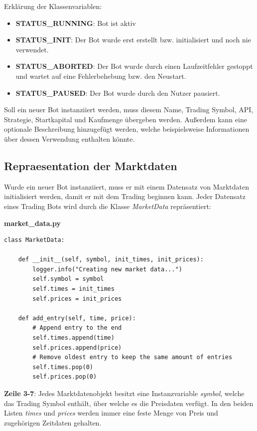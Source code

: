 \documentclass[oneside]{ausarbeitung}
\begin{document}
Erklärung der Klassenvariablen:
\begin{itemize}
	\item \textbf{STATUS\_RUNNING}: Bot ist aktiv
	\item \textbf{STATUS\_INIT}: Der Bot wurde erst erstellt bzw. initialisiert
		und noch nie verwendet.
	\item \textbf{STATUS\_ABORTED}: Der Bot wurde durch einen Laufzeitfehler
		gestoppt und wartet auf eine Fehlerbehebung bzw. den Neustart.
	\item \textbf{STATUS\_PAUSED}: Der Bot wurde durch den Nutzer pausiert.
\end{itemize}

Soll ein neuer Bot instanziiert werden, muss diesem Name, Trading Symbol, API, Strategie, Startkapital und Kaufmenge übergeben werden. Außerdem kann eine optionale Beschreibung hinzugefügt werden, welche beispielsweise Informationen über dessen Verwendung enthalten könnte.

\subsection{Repraesentation der Marktdaten}
\label{sub:repräsentation_der_marktdaten}

Wurde ein neuer Bot instanziiert, muss er mit einem Datensatz von Marktdaten initialisiert werden, damit er mit dem Trading beginnen kann. Jeder Datensatz eines Trading Bots wird durch die Klasse \textit{MarketData} repräsentiert:

\lstset{language=Python}
\lstset{frame=lines}
\lstset{basicstyle=\footnotesize}
\textbf{market\_data.py}
\begin{lstlisting}
class MarketData:

	def __init__(self, symbol, init_times, init_prices):
		logger.info("Creating new market data...")
		self.symbol = symbol
		self.times = init_times
		self.prices = init_prices
        
	def add_entry(self, time, price):
		# Append entry to the end
		self.times.append(time)
		self.prices.append(price)
		# Remove oldest entry to keep the same amount of entries
		self.times.pop(0)
		self.prices.pop(0)
\end{lstlisting}

\textbf{Zeile 3-7}: Jedes Marktdatenobjekt besitzt eine Instanzvariable \textit{symbol}, welche das Trading Symbol enthält, über welche es die Preisdaten verfügt. In den beiden Listen \textit{times} und \textit{prices} werden immer eine feste Menge von Preis und zugehörigen Zeitdaten gehalten.
\end{document}
